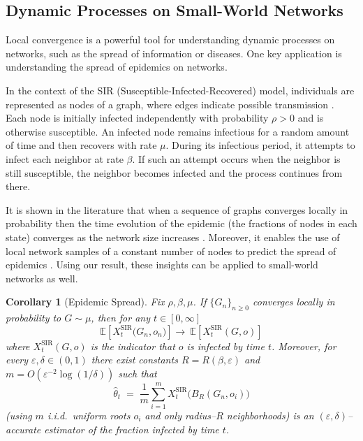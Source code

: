 \documentclass[10pt]{amsart}
\newtheorem{corollary}[theorem]{Corollary}
\begin{document}
\subsection{Dynamic Processes on Small-World Networks}
Local convergence is a powerful tool for understanding dynamic processes on networks, such as the spread of information or diseases. One key application is understanding the spread of epidemics on networks. 


In the context of the SIR (Susceptible-Infected-Recovered) model, individuals are represented as nodes of a graph, where edges indicate possible transmission \cite{bernoulli1766essai, kermack1927contribution, ross1917pathometry3}. Each node is initially infected independently with probability $\rho>0$ and is otherwise susceptible.
An infected node remains infectious for a random amount of time and then recovers with rate $\mu$. During its infectious period, it attempts to infect each neighbor at rate $\beta$. If such an attempt occurs when the neighbor is still susceptible, the neighbor becomes infected and the process continues from there.


It is shown in the literature that when a sequence of  graphs converges locally in probability  then 
the time evolution of the epidemic (the fractions of nodes in each state) converges as the network size increases \cite{alimohammadi2023epidemic, milewska2025sirlocallyconvergingdynamic}. Moreover, it enables the use of local network samples of a constant number of nodes to predict the spread of epidemics \cite{alimohammadi2022algorithms}. Using our result, these insights can be applied to small-world networks as well.  

\begin{corollary}[Epidemic Spread]\label{cor:sir-finite}
Fix $\rho,\beta,\mu$. If $\{G_n\}_{n\geq0}$  converges locally in probability to $G\sim \mu$, then for any $t\in[0,\infty]$
\[
\mathbb{E} \left[X_t^{\mathrm{SIR}}\!\big(G_n,o_n\big) \right] \longrightarrow\ \mathbb{E}  \left[X_t^{\mathrm{SIR}}(G,o)
\right] \]
where $X_t^{\mathrm{SIR}}(G,o)$ is the indicator that $o$ is infected by time $t$.
Moreover, for every $\varepsilon,\delta\in(0,1)$ there exist constants $R=R(\beta, \varepsilon)$ and $m=O(\varepsilon^{-2}\log(1/\delta))$ such that
\[
\hat\theta_t \;=\; \frac1m\sum_{i=1}^m X_t^{\mathrm{SIR}}\!\big(B_R(G_n,o_i)\big)
\]
(using $m$ i.i.d.\ uniform roots $o_i$ and only radius–$R$ neighborhoods) is an $(\varepsilon,\delta)$–accurate estimator of the fraction infected by time $t$.
\end{corollary}
\end{document}
